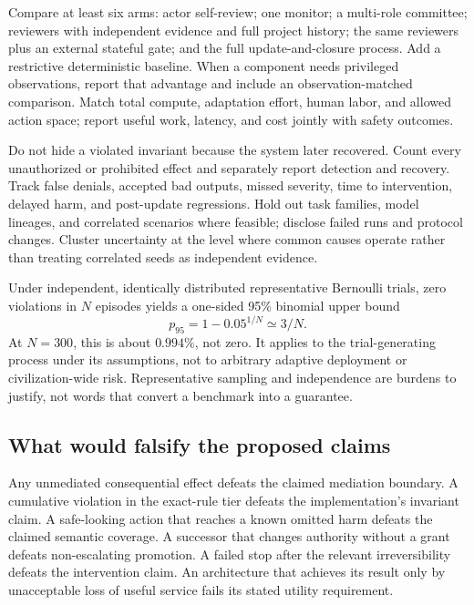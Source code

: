 \documentclass[10pt,twocolumn,letterpaper]{article}
\begin{document}
Compare at least six arms: actor self-review; one monitor; a multi-role committee; reviewers with independent evidence and full project history; the same reviewers plus an external stateful gate; and the full update-and-closure process. Add a restrictive deterministic baseline. When a component needs privileged observations, report that advantage and include an observation-matched comparison. Match total compute, adaptation effort, human labor, and allowed action space; report useful work, latency, and cost jointly with safety outcomes.

Do not hide a violated invariant because the system later recovered. Count every unauthorized or prohibited effect and separately report detection and recovery. Track false denials, accepted bad outputs, missed severity, time to intervention, delayed harm, and post-update regressions. Hold out task families, model lineages, and correlated scenarios where feasible; disclose failed runs and protocol changes. Cluster uncertainty at the level where common causes operate rather than treating correlated seeds as independent evidence.

Under independent, identically distributed representative Bernoulli trials, zero violations in $N$ episodes yields a one-sided 95\% binomial upper bound
\begin{equation}
p_{95}=1-0.05^{1/N}\simeq3/N.
\label{eq:binomial}
\end{equation}
At $N=300$, this is about $0.994\%$, not zero. It applies to the trial-generating process under its assumptions, not to arbitrary adaptive deployment or civilization-wide risk. Representative sampling and independence are burdens to justify, not words that convert a benchmark into a guarantee.

\subsection{What would falsify the proposed claims}
Any unmediated consequential effect defeats the claimed mediation boundary. A cumulative violation in the exact-rule tier defeats the implementation's invariant claim. A safe-looking action that reaches a known omitted harm defeats the claimed semantic coverage. A successor that changes authority without a grant defeats non-escalating promotion. A failed stop after the relevant irreversibility defeats the intervention claim. An architecture that achieves its result only by unacceptable loss of useful service fails its stated utility requirement.
\end{document}
